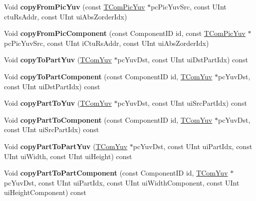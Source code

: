 \begin{DoxyCompactItemize}
Void {\bfseries copy\+From\+Pic\+Yuv} (const \hyperlink{class_t_com_pic_yuv}{T\+Com\+Pic\+Yuv} $\ast$pc\+Pic\+Yuv\+Src, const U\+Int ctu\+Rs\+Addr, const U\+Int ui\+Abs\+Zorder\+Idx)
\item 
\mbox{\label{class_t_com_yuv_af7db04579acc0074721e414d715d784d}} 
Void {\bfseries copy\+From\+Pic\+Component} (const Component\+ID id, const \hyperlink{class_t_com_pic_yuv}{T\+Com\+Pic\+Yuv} $\ast$pc\+Pic\+Yuv\+Src, const U\+Int i\+Ctu\+Rs\+Addr, const U\+Int ui\+Abs\+Zorder\+Idx)
\item 
\mbox{\label{class_t_com_yuv_a7e77cbfb161122f593b7b3c1d5027a00}} 
Void {\bfseries copy\+To\+Part\+Yuv} (\hyperlink{class_t_com_yuv}{T\+Com\+Yuv} $\ast$pc\+Yuv\+Dst, const U\+Int ui\+Dst\+Part\+Idx) const
\item 
\mbox{\label{class_t_com_yuv_a22750b4429bde0ae8a912ae14d4a4f9a}} 
Void {\bfseries copy\+To\+Part\+Component} (const Component\+ID id, \hyperlink{class_t_com_yuv}{T\+Com\+Yuv} $\ast$pc\+Yuv\+Dst, const U\+Int ui\+Dst\+Part\+Idx) const
\item 
\mbox{\label{class_t_com_yuv_afedafddc439fca52a668251b33d79b2e}} 
Void {\bfseries copy\+Part\+To\+Yuv} (\hyperlink{class_t_com_yuv}{T\+Com\+Yuv} $\ast$pc\+Yuv\+Dst, const U\+Int ui\+Src\+Part\+Idx) const
\item 
\mbox{\label{class_t_com_yuv_acec8daff086d19f8f33a749af8a19d0e}} 
Void {\bfseries copy\+Part\+To\+Component} (const Component\+ID id, \hyperlink{class_t_com_yuv}{T\+Com\+Yuv} $\ast$pc\+Yuv\+Dst, const U\+Int ui\+Src\+Part\+Idx) const
\item 
\mbox{\label{class_t_com_yuv_a41929f4e8758bb27a4a7f502ed90dabd}} 
Void {\bfseries copy\+Part\+To\+Part\+Yuv} (\hyperlink{class_t_com_yuv}{T\+Com\+Yuv} $\ast$pc\+Yuv\+Dst, const U\+Int ui\+Part\+Idx, const U\+Int ui\+Width, const U\+Int ui\+Height) const
\item 
\mbox{\label{class_t_com_yuv_a57644d00c73e32c747b1dc00470d381e}} 
Void {\bfseries copy\+Part\+To\+Part\+Component} (const Component\+ID id, \hyperlink{class_t_com_yuv}{T\+Com\+Yuv} $\ast$pc\+Yuv\+Dst, const U\+Int ui\+Part\+Idx, const U\+Int ui\+Width\+Component, const U\+Int ui\+Height\+Component) const

\end{DoxyCompactItemize}
